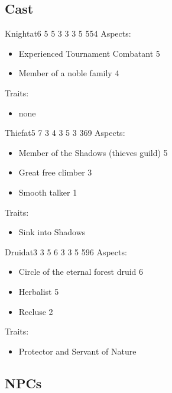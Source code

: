 \documentclass[11pt]{article}
\begin{document}
{\subsection{Cast}
\label{sec:orgb26d5f6}

\begin{npc}{Knight}{at}{6 5 5 3 3 3 5 5}{54}
Aspects:
\begin{itemize}
\item Experienced Tournament Combatant 5
\item Member of a noble family 4
\end{itemize}

\columnbreak

Traits:
\begin{itemize}
\item none
\end{itemize}
\end{npc}

\begin{npc}{Thief}{at}{5 7 3 4 3 5 3 3}{69}
Aspects:
\begin{itemize}
\item Member of the Shadows (thieves guild) 5
\item Great free climber 3
\item Smooth talker 1
\end{itemize}

\columnbreak

Traits:
\begin{itemize}
\item Sink into Shadows
\end{itemize}
\end{npc}

\begin{npc}{Druid}{at}{3 3 5 6 3 3 5 5}{96}
Aspects:
\begin{itemize}
\item Circle of the eternal forest druid 6
\item Herbalist 5
\item Recluse 2
\end{itemize}

\columnbreak

Traits:
\begin{itemize}
\item Protector and Servant of Nature
\end{itemize}
\end{npc}
\subsection{NPCs}
\label{sec:org331b358}

}
\end{document}
